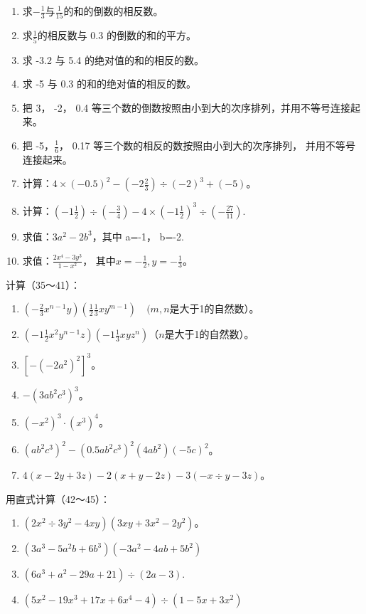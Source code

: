 \begin{enumerate}[start=25]
\item
  求\(-\frac{1}{3}\)与\(\frac{1}{15}\)的和的倒数的相反数。
\item
  求\(\frac{1}{5}\)的相反数与 0.3 的倒数的和的平方。
\item
  求 -3.2 与 5.4 的绝对值的和的相反的数。
\item
  求 -5 与 0.3 的和的绝对值的相反的数。
\item
  把 3， -2， 0.4
  等三个数的倒数按照由小到大的次序排列，并用不等号连接起来。
\item
  把 -5，\(\frac{1}{6}\)， 0.17
  等三个数的相反的数按照由小到大的次序排列， 并用不等号连接起来。
\item
  计算：\(4 \times (-0.5)^{2} - \left(-2\frac{2}{3}\right) \div (-2)^{3} + (-5)\)。
\item
  计算：\(\left(-1\frac{1}{2}\right)\div\left(-\frac{3}{4}\right)-4\times\left(-1\frac{1}{2}\right)^{3}\div\left(-\frac{27}{11}\right).\)
\item
  求值：\(3a^{2}-2b^{3}\)，其中 a=-1， b=-2.
\item
  求值：\(\frac{2x^4 - 3y^3}{1 - x^2}\)，
  其中\(x = -\frac{1}{2}, y = -\frac{1}{3}\)。
\end{enumerate}

计算（35～41）：

\begin{enumerate}[start=35]
\item
  \(\left(-\frac{2}{3} x^{n-1}y\right)\left(\frac{1}{2}\frac{1}{3} xy^{m-1}\right)\quad (m,n\)是大于1的自然数）。
\item
  \(\left(-1\frac{1}{2} x^2 y^{n-1}z\right)\left(-1\frac{1}{3} xy z^n\right)\)（\(n\)是大于1的自然数）。
\item
  \([-(-2a^2)^2]^3\)。
\item
  \(-(3ab^{2}c^{3})^{3}\)。
\item
  \((-x^{2})^{3} \cdot (x^{3})^{4}\)。
\item
  \((ab^{2}c^{3})^{2} - (0.5ab^{2}c^{3})^{2}(4ab^{2})(-5c)^{2}\)。
\item
  \(4(x - 2y + 3z) - 2(x + y - 2z) - 3(-x \div y - 3z)\)。
\end{enumerate}

用直式计算（42～45）：

\begin{enumerate}[start=42]
\item
  \((2x^{2} \div 3y^{2} - 4xy)(3xy + 3x^{2} - 2y^{2})\)。
\item
  \((3a^{3} - 5a^{2}b + 6b^{3})(-3a^{2} - 4ab + 5b^{2})\)
\item
  \((6a^{3} + a^{2} - 29a + 21)\div (2a - 3).\)
\item
  \((5x^{2} - 19x^{3} + 17x + 6x^{4} - 4)\div (1 - 5x + 3x^{2})\)
\end{enumerate}

